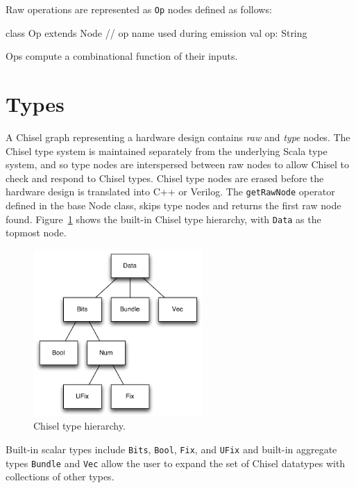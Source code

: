 \documentclass[10pt,twocolumn]{article}
\def\code#1{{\small\tt #1}}
\begin{document}
Raw operations are represented as \code{Op} nodes defined as follows:

\begin{scala}
class Op extends Node {
  // op name used during emission
  val op: String
}
\end{scala}

\noindent
Ops compute a combinational function of their inputs.

\section{Types}
\label{sec:types}

A Chisel graph representing a hardware design contains {\em raw} and
{\em type} nodes.  The Chisel type system is maintained separately
from the underlying Scala type system, and so type nodes are
interspersed between raw nodes to allow Chisel to check and respond to
Chisel types.  Chisel type nodes are erased before the hardware design
is translated into C++ or Verilog.  The \code{getRawNode} operator
defined in the base Node class, skips type nodes and returns the first
raw node found.  Figure~\ref{fig:type-hierarchy} shows the built-in
Chisel type hierarchy, with \code{Data} as the topmost node.

\begin{figure}[h]
\centering
\includegraphics[height=2.5in]{figs/type-hierarchy.pdf}
\caption{Chisel type hierarchy.}
\label{fig:type-hierarchy}
\end{figure}

\noindent
Built-in scalar types include \code{Bits}, \code{Bool}, \code{Fix},
and \code{UFix} and built-in aggregate types \code{Bundle} and
\code{Vec} allow the user to expand the set of Chisel datatypes with
collections of other types.
\end{document}
